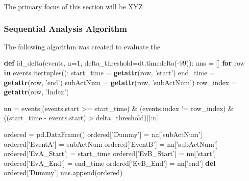 \documentclass[11pt,]{article}
\newenvironment{Shaded}{\begin{snugshade}}{\end{snugshade}}
\newcommand{\BuiltInTok}[1]{\textcolor[rgb]{0.39,0.29,0.61}{\textbf{#1}}}
\newcommand{\ControlFlowTok}[1]{\textcolor[rgb]{0.12,0.11,0.11}{\textbf{#1}}}
\newcommand{\DecValTok}[1]{\textcolor[rgb]{0.69,0.50,0.00}{#1}}
\newcommand{\KeywordTok}[1]{\textcolor[rgb]{0.12,0.11,0.11}{\textbf{#1}}}
\newcommand{\NormalTok}[1]{\textcolor[rgb]{0.12,0.11,0.11}{#1}}
\newcommand{\OperatorTok}[1]{\textcolor[rgb]{0.12,0.11,0.11}{#1}}
\newcommand{\StringTok}[1]{\textcolor[rgb]{0.75,0.01,0.01}{#1}}
\begin{document}
The primary focus of this section will be XYZ

\hypertarget{sequential-analysis-algorithm}{%
\subsubsection{Sequential Analysis
Algorithm}\label{sequential-analysis-algorithm}}

The following algorithm was created to evaluate the

\begin{Shaded}
\begin{Highlighting}[]
\KeywordTok{def}\NormalTok{ id_delta(events, n}\OperatorTok{=}\DecValTok{1}\NormalTok{, delta_threshold}\OperatorTok{=}\NormalTok{dt.timedelta(}\OperatorTok{-}\DecValTok{99}\NormalTok{)):}
\NormalTok{    nns }\OperatorTok{=}\NormalTok{ []}
    \ControlFlowTok{for}\NormalTok{ row }\KeywordTok{in}\NormalTok{ events.itertuples():}
\NormalTok{        start_time }\OperatorTok{=} \BuiltInTok{getattr}\NormalTok{(row, }\StringTok{'start'}\NormalTok{)}
\NormalTok{        end_time }\OperatorTok{=} \BuiltInTok{getattr}\NormalTok{(row, }\StringTok{'end'}\NormalTok{)}
\NormalTok{        subActNum }\OperatorTok{=} \BuiltInTok{getattr}\NormalTok{(row, }\StringTok{'subActNum'}\NormalTok{)}
\NormalTok{        row_index }\OperatorTok{=} \BuiltInTok{getattr}\NormalTok{(row, }\StringTok{'Index'}\NormalTok{)}
        
\NormalTok{        nn }\OperatorTok{=}\NormalTok{ events[(events.start }\OperatorTok{>=}\NormalTok{ start_time) }\OperatorTok{&} 
\NormalTok{                    (events.index }\OperatorTok{!=}\NormalTok{ row_index) }\OperatorTok{&} 
\NormalTok{                    ((start_time }\OperatorTok{-}\NormalTok{ events.start) }\OperatorTok{>}\NormalTok{ delta_threshold)][:n]}
        
\NormalTok{        ordered }\OperatorTok{=}\NormalTok{ pd.DataFrame()}
\NormalTok{        ordered[}\StringTok{'Dummy'}\NormalTok{] }\OperatorTok{=}\NormalTok{ nn[}\StringTok{'subActNum'}\NormalTok{]}
\NormalTok{        ordered[}\StringTok{'EventA'}\NormalTok{] }\OperatorTok{=}\NormalTok{ subActNum}
\NormalTok{        ordered[}\StringTok{'EventB'}\NormalTok{] }\OperatorTok{=}\NormalTok{ nn[}\StringTok{'subActNum'}\NormalTok{]}
\NormalTok{        ordered[}\StringTok{'EvA_Start'}\NormalTok{] }\OperatorTok{=}\NormalTok{ start_time}
\NormalTok{        ordered[}\StringTok{'EvB_Start'}\NormalTok{] }\OperatorTok{=}\NormalTok{ nn[}\StringTok{'start'}\NormalTok{]}
\NormalTok{        ordered[}\StringTok{'EvA_End'}\NormalTok{] }\OperatorTok{=}\NormalTok{ end_time}
\NormalTok{        ordered[}\StringTok{'EvB_End'}\NormalTok{] }\OperatorTok{=}\NormalTok{ nn[}\StringTok{'end'}\NormalTok{]}
        \KeywordTok{del}\NormalTok{ ordered[}\StringTok{'Dummy'}\NormalTok{]}
\NormalTok{        nns.append(ordered)}
  

\end{Highlighting}
\end{Shaded}
\end{document}
